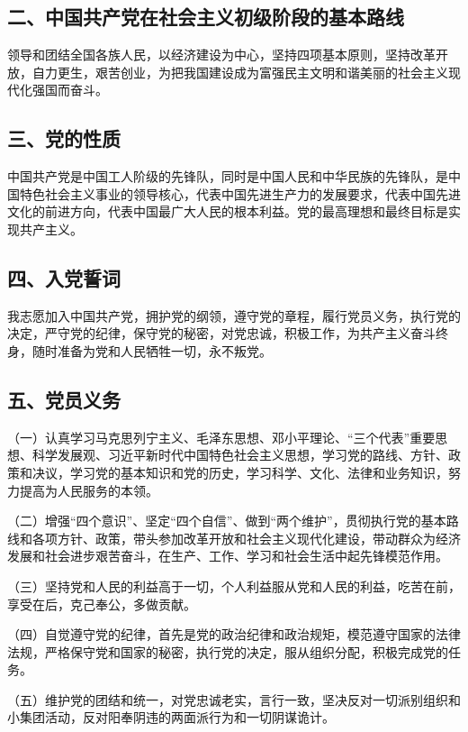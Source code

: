 \documentclass[UTF8,11pt,a4paper]{ctexart}
\begin{document}
\subsection*{二、中国共产党在社会主义初级阶段的基本路线}

领导和团结全国各族人民，以经济建设为中心，坚持四项基本原则，坚持改革开放，自力更生，艰苦创业，为把我国建设成为富强民主文明和谐美丽的社会主义现代化强国而奋斗。

\subsection*{三、党的性质}

中国共产党是中国工人阶级的先锋队，同时是中国人民和中华民族的先锋队，是中国特色社会主义事业的领导核心，代表中国先进生产力的发展要求，代表中国先进文化的前进方向，代表中国最广大人民的根本利益。党的最高理想和最终目标是实现共产主义。

\subsection*{四、入党誓词}

我志愿加入中国共产党，拥护党的纲领，遵守党的章程，履行党员义务，执行党的决定，严守党的纪律，保守党的秘密，对党忠诚，积极工作，为共产主义奋斗终身，随时准备为党和人民牺牲一切，永不叛党。

\subsection*{五、党员义务}

\noindent （一）认真学习马克思列宁主义、毛泽东思想、邓小平理论、“三个代表”重要思想、科学发展观、习近平新时代中国特色社会主义思想，学习党的路线、方针、政策和决议，学习党的基本知识和党的历史，学习科学、文化、法律和业务知识，努力提高为人民服务的本领。

\noindent （二）增强“四个意识”、坚定“四个自信”、做到“两个维护”，贯彻执行党的基本路线和各项方针、政策，带头参加改革开放和社会主义现代化建设，带动群众为经济发展和社会进步艰苦奋斗，在生产、工作、学习和社会生活中起先锋模范作用。

\noindent （三）坚持党和人民的利益高于一切，个人利益服从党和人民的利益，吃苦在前，享受在后，克己奉公，多做贡献。

\noindent （四）自觉遵守党的纪律，首先是党的政治纪律和政治规矩，模范遵守国家的法律法规，严格保守党和国家的秘密，执行党的决定，服从组织分配，积极完成党的任务。

\noindent （五）维护党的团结和统一，对党忠诚老实，言行一致，坚决反对一切派别组织和小集团活动，反对阳奉阴违的两面派行为和一切阴谋诡计。
\end{document}
